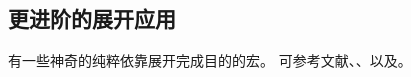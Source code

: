\documentclass{book}
\begin{document}
\subsection{更进阶的展开应用}

有一些神奇的纯粹依靠展开完成目的的宏。
可参考文献\cite{E2}、\cite{Jeffrey:lists}、以及\cite{Maus2}。

\endofchapter
\end{document}
